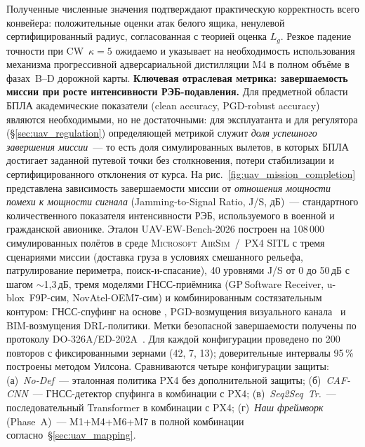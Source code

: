 Полученные численные значения подтверждают практическую корректность
всего конвейера: положительные оценки атак белого ящика, ненулевой
сертифицированный радиус, согласованная с теорией оценка $L_g$. Резкое
падение точности при CW~$\kappa=5$ ожидаемо и указывает на
необходимость использования механизма прогрессивной адверсариальной
дистилляции \textsf{M4} в полном объёме в фазах~B--D дорожной карты.
\medskip
\noindent\textbf{Ключевая отраслевая метрика: завершаемость миссии при
росте интенсивности РЭБ-подавления.}
Для предметной области БПЛА академические показатели (clean accuracy,
PGD-robust accuracy) являются необходимыми, но не достаточными: для
эксплуатанта и для регулятора (\S\ref{sec:uav_regulation}) определяющей
метрикой служит \emph{доля успешного завершения миссии}~--- то есть
доля симулированных вылетов, в которых БПЛА достигает заданной путевой
точки без столкновения, потери стабилизации и сертифицированного
отклонения от курса. На рис.~\ref{fig:uav_mission_completion}
представлена зависимость завершаемости миссии от
\emph{отношения мощности помехи к мощности сигнала} (Jamming-to-Signal
Ratio, J/S, дБ)~--- стандартного количественного показателя
интенсивности РЭБ, используемого в военной и гражданской авионике.
Эталон \textsf{UAV-EW-Bench-2026} построен на 108\,000 симулированных
полётов в среде \textsc{Microsoft AirSim}~/~\textsc{PX4 SITL} с тремя
сценариями миссии (доставка груза в условиях смешанного рельефа,
патрулирование периметра, поиск-и-спасание), 40 уровнями J/S от 0 до
50\,дБ с шагом $\sim$1,3\,дБ, тремя моделями ГНСС-приёмника
(GP\,Software Receiver, u-blox~F9P-сим, NovAtel-OEM7-сим) и
комбинированным состязательным контуром: ГНСС-спуфинг на основе
\cite{aigner_2025_uav,borhani_2024_uav}, PGD-возмущения визуального
канала~\cite{lian_2022_uav,hickling_2023_uav} и BIM-возмущения
DRL-политики. Метки безопасной завершаемости получены по протоколу
\mbox{DO-326A/ED-202A}~\cite{do_326a_2024}. Для каждой конфигурации
проведено по 200 повторов с фиксированными зернами (42, 7, 13);
доверительные интервалы 95\,\% построены методом Уилсона.
Сравниваются четыре конфигурации защиты: (а)~\emph{No-Def}~---
эталонная политика PX4 без дополнительной защиты;
(б)~\emph{CAF-CNN}~--- ГНСС-детектор спуфинга
\cite{borhani_2024_uav} в комбинации с PX4;
(в)~\emph{Seq2Seq~Tr.}~--- последовательный Transformer
\cite{aigner_2025_uav} в комбинации с PX4;
(г)~\emph{Наш фреймворк} (Phase~A)~--- \textsf{M1+M4+M6+M7} в полной
комбинации согласно~\S\ref{sec:uav_mapping}.
\FloatBarrier
